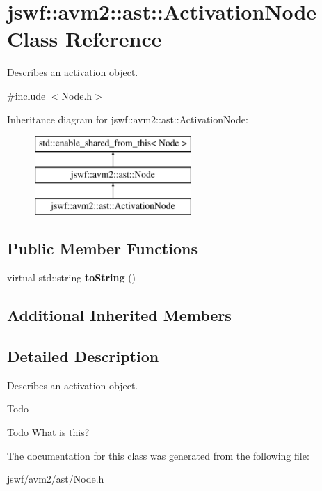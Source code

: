 \hypertarget{classjswf_1_1avm2_1_1ast_1_1_activation_node}{\section{jswf\+:\+:avm2\+:\+:ast\+:\+:Activation\+Node Class Reference}
\label{classjswf_1_1avm2_1_1ast_1_1_activation_node}
}


Describes an activation object.  




{\ttfamily \#include $<$Node.\+h$>$}

Inheritance diagram for jswf\+:\+:avm2\+:\+:ast\+:\+:Activation\+Node\+:\begin{figure}[H]
\begin{center}
\leavevmode
\includegraphics[height=3.000000cm]{classjswf_1_1avm2_1_1ast_1_1_activation_node}
\end{center}
\end{figure}
\subsection*{Public Member Functions}
\begin{DoxyCompactItemize}
\item 
\hypertarget{classjswf_1_1avm2_1_1ast_1_1_activation_node_addf599d16318841925cabd849c336251}{virtual std\+::string {\bfseries to\+String} ()}\label{classjswf_1_1avm2_1_1ast_1_1_activation_node_addf599d16318841925cabd849c336251}

\end{DoxyCompactItemize}
\subsection*{Additional Inherited Members}


\subsection{Detailed Description}
Describes an activation object. 

\begin{DoxyRefDesc}{Todo}
\item[\hyperlink{todo__todo000004}{Todo}]What is this? \end{DoxyRefDesc}


The documentation for this class was generated from the following file\+:\begin{DoxyCompactItemize}
\item 
jswf/avm2/ast/Node.\+h\end{DoxyCompactItemize}
